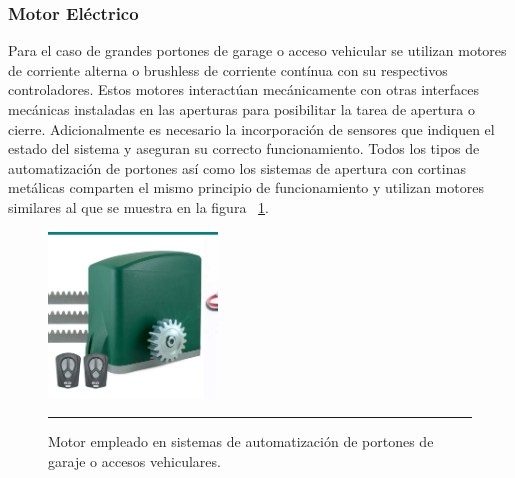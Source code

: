 \subsubsection{Motor Eléctrico}
Para el caso de grandes portones de garage o acceso vehicular se utilizan motores de corriente alterna o brushless de corriente contínua con su respectivos controladores. Estos motores interactúan mecánicamente con otras interfaces mecánicas instaladas en las aperturas para posibilitar la tarea de apertura o cierre. Adicionalmente es necesario la incorporación de sensores que indiquen el estado del sistema y aseguran su correcto funcionamiento.
Todos los tipos de automatización de portones así como los sistemas de apertura con cortinas metálicas comparten el mismo principio de funcionamiento y utilizan motores similares al que se muestra en la figura ~\ref{fig:motorport}.

\begin{figure}[htbp]
	\centering
	\includegraphics[width=0.4\textwidth]{Pictures/motor.png}
	\rule{35em}{1pt}
	\caption[Motor Portones Automatizados]{Motor empleado en sistemas de automatización de portones de garaje o accesos vehiculares. }
	\label{fig:motorport}
\end{figure}

